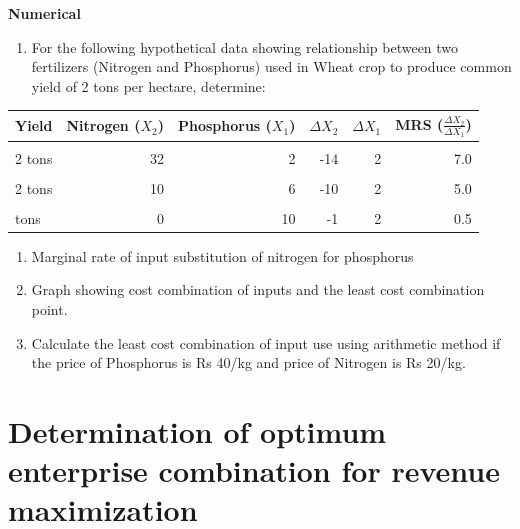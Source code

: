 \documentclass[
]{article}
\providecommand{\tightlist}{%
  \setlength{\itemsep}{0pt}\setlength{\parskip}{0pt}}
\begin{document}
\textbf{Numerical}

\begin{enumerate}
\def\labelenumi{\arabic{enumi}.}
\tightlist
\item
  For the following hypothetical data showing relationship between two fertilizers (Nitrogen and Phosphorus) used in Wheat crop to produce common yield of 2 tons per hectare, determine:
\end{enumerate}

\begin{table}[H]
\centering\begingroup\fontsize{8}{10}\selectfont

\begin{tabular}{lrrrrr}
\toprule
Yield & Nitrogen ($X_2$) & Phosphorus ($X_1$) & $\Delta X_2$ & $\Delta X_1$ & MRS ($\frac{\Delta X_2}{\Delta X_1}$)\\
\midrule
\cellcolor{gray!6}{2 tons} & \cellcolor{gray!6}{46} & \cellcolor{gray!6}{0} & \cellcolor{gray!6}{} & \cellcolor{gray!6}{} & \cellcolor{gray!6}{}\\
2 tons & 32 & 2 & -14 & 2 & 7.0\\
\cellcolor{gray!6}{2 tons} & \cellcolor{gray!6}{20} & \cellcolor{gray!6}{4} & \cellcolor{gray!6}{-12} & \cellcolor{gray!6}{2} & \cellcolor{gray!6}{6.0}\\
2 tons & 10 & 6 & -10 & 2 & 5.0\\
\cellcolor{gray!6}{2 tons} & \cellcolor{gray!6}{1} & \cellcolor{gray!6}{8} & \cellcolor{gray!6}{-9} & \cellcolor{gray!6}{2} & \cellcolor{gray!6}{4.5}\\
\addlinespace
2 tons & 0 & 10 & -1 & 2 & 0.5\\
\bottomrule
\end{tabular}
\endgroup{}
\end{table}

\begin{enumerate}
\def\labelenumi{\alph{enumi}.}
\tightlist
\item
  Marginal rate of input substitution of nitrogen for phosphorus
\item
  Graph showing cost combination of inputs and the least cost combination point.
\item
  Calculate the least cost combination of input use using arithmetic method if the price of Phosphorus is Rs 40/kg and price of Nitrogen is Rs 20/kg.
\end{enumerate}

\clearpage

\hypertarget{determination-of-optimum-enterprise-combination-for-revenue-maximization}{%
\section{Determination of optimum enterprise combination for revenue maximization}\label{determination-of-optimum-enterprise-combination-for-revenue-maximization}}
\end{document}
